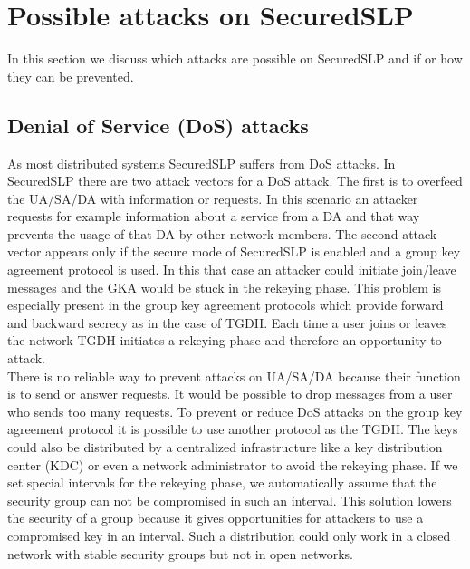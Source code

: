 \section{Possible attacks on SecuredSLP}
In this section we discuss which attacks are possible on SecuredSLP and if or how they can be prevented.

\subsection{Denial of Service (DoS) attacks}\label{sec:DoS}
As most distributed systems SecuredSLP suffers from DoS attacks. In SecuredSLP there are two attack vectors for a DoS attack. The first is to overfeed the UA/SA/DA with information or requests. In this scenario an attacker requests for example information about a service from a DA and that way prevents the usage of that DA by other network members. The second attack vector appears only if the secure mode of SecuredSLP is enabled and a group key agreement protocol is used. In this that case an attacker could initiate join/leave messages and the GKA would be stuck in the rekeying phase. This problem is especially present in the group key agreement protocols which provide forward and backward secrecy as in the case of TGDH. Each time a user joins or leaves the network TGDH initiates a rekeying phase and therefore an opportunity to attack.\\
There is no reliable way to prevent attacks on UA/SA/DA because their function is to send or answer requests. It would be possible to drop messages from a user who sends too many requests. To prevent or reduce DoS attacks on the group key agreement protocol it is possible to use another protocol as the TGDH. The keys could also be distributed by a centralized infrastructure like a key distribution center (KDC) or even a network administrator to avoid the rekeying phase. If we set special intervals for the rekeying phase, we automatically assume that the security group can not be compromised in such an interval. This solution lowers the security of a group because it gives opportunities for attackers to use a compromised key in an interval. Such a distribution could only work in a closed network with stable security groups but not in open networks.

